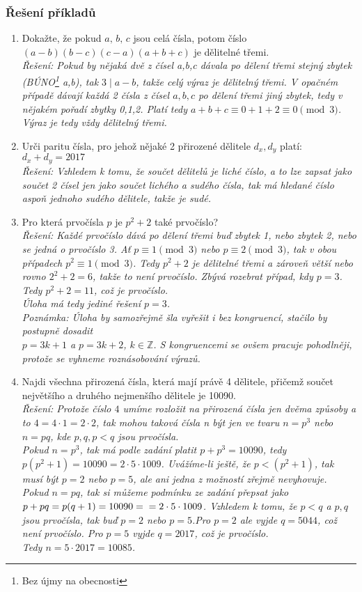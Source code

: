 \documentclass[12pt,a4paper]{report}
\begin{document}
\subsubsection*{Řešení příkladů}		
\begin{enumerate}
	
	\item Dokažte, že pokud $a,\,b,\,c$ jsou celá čísla, potom číslo $(a - b)(b - c)(c -a)(a + b + c)$ je dělitelné
	třemi.
	\\ \textit{Řešení: Pokud by nějaká dvě z čísel a,b,c dávala po dělení třemi stejný zbytek (BÚNO\footnote{Bez újmy na obecnosti} a,b), tak $3 \mid a-b$, takže celý výraz je dělitelný třemi. V opačném případě dávají každá 2 čísla z čísel $a,b,c$ po dělení třemi jiný zbytek, tedy v nějakém pořadí zbytky 0,1,2. Platí tedy $a+b+c \equiv 0+1+2 \equiv 0 \pmod 3$. Výraz je tedy vždy dělitelný třemi.}
	\item Urči paritu čísla, pro jehož nějaké 2 přirozené dělitele $d_x,d_y$ platí: $d_x+d_y=2017$ 
	\\ \textit{Řešení: Vzhledem k tomu, že součet dělitelů je liché číslo, a to lze zapsat jako součet 2 čísel jen jako součet lichého a sudého čísla, tak má hledané číslo aspoň jednoho sudého dělitele, takže je sudé.}
	\item Pro která prvočísla $p$ je $p^2 + 2$ také prvočíslo?
	\\ \textit{Řešení: Každé prvočíslo dává po dělení třemi buď zbytek 1, nebo zbytek 2, nebo se jedná o prvočíslo 3. Ať $p \equiv 1 \pmod{3}$ nebo $p \equiv 2 \pmod{3}$, tak v obou případech $p^2 \equiv 1 \pmod{3}$. Tedy $p^2+2$ je dělitelné třemi a zároveň větší nebo rovno $2^2+2=6$, takže to není prvočíslo. Zbývá rozebrat případ, kdy $p=3$. Tedy $p^2+2=11$, což je prvočíslo.\\Úloha má tedy jediné řešení $p=3$.\\Poznámka: Úloha by samozřejmě šla vyřešit i bez kongruencí, stačilo by postupně dosadit \\$p=3k+1$ a $p=3k+2$, $k \in \mathbb{Z}$. S  kongruencemi se ovšem pracuje pohodlněji, protože se vyhneme roznásobování výrazů. }
	\item Najdi všechna přirozená čísla, která mají právě 4 dělitele, přičemž součet největšího a druhého nejmenšího dělitele je 10090.
	\\ \textit{Řešení: Protože číslo $4$ umíme rozložit na přirozená čísla jen dvěma způsoby a to $4=4\cdot1=2\cdot2$, tak mohou taková čísla n být jen ve tvaru $n=p^3$ nebo $n=pq$, kde $p,q,p<q$ jsou prvočísla.\\Pokud $n=p^3$, tak má podle zadání platit $p+p^3=10090$, tedy $p(p^2+1)=10090=2\cdot5\cdot1009$. Uvážíme-li ještě, že $p<(p^2+1)$, tak musí být $p=2$ nebo $p=5$, ale ani jedna z možností zřejmě nevyhovuje.\\Pokud $n=pq$, tak si můžeme podmínku ze zadání přepsat jako $p+pq=p(q+1)=10090=\\=2\cdot5\cdot1009$. Vzhledem k tomu, že $p<q$ a $p,q$ jsou prvočísla, tak buď $p=2$ nebo $p=5$.Pro $p=2$ ale vyjde $q=5044$, což není prvočíslo. Pro $p=5$ vyjde $q=2017$, což je prvočíslo. \\Tedy $n=5\cdot2017=10085$. }

\end{enumerate}
\end{document}
